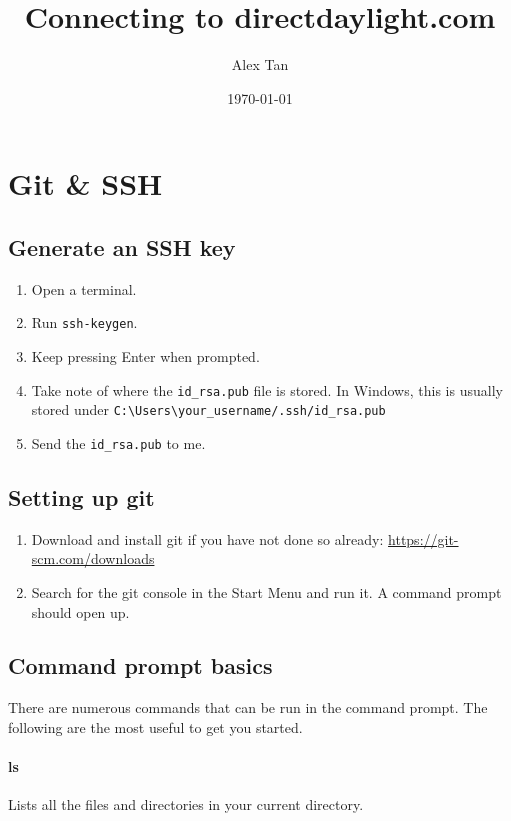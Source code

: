 \documentclass[11pt]{article}
\begin{document}
	
\begin{titlepage}
\title{Connecting to directdaylight.com}
\author{Alex Tan}
\date{\today}
\maketitle{}
\thispagestyle{empty}
\end{titlepage}

\tableofcontents
\thispagestyle{empty}
\clearpage

\setcounter{page}{1}

\section{Git \& SSH}
\subsection{Generate an SSH key}
\begin{enumerate}
\item Open a terminal.
\item Run \lstinline{ssh-keygen}.
\item Keep pressing Enter when prompted.
\item Take note of where the \lstinline{id_rsa.pub} file is stored. In Windows, this is usually stored under \lstinline{C:\Users\your_username/.ssh/id_rsa.pub}
\item Send the \lstinline{id_rsa.pub} to me.
\end{enumerate}
\subsection{Setting up git}
\begin{enumerate}
\item Download and install git if you have not done so already: \url{https://git-scm.com/downloads}
\item Search for the git console in the Start Menu and run it. A command prompt should open up.
\end{enumerate}
\subsection{Command prompt basics}
There are numerous commands that can be run in the command prompt. The following are the most useful to get you started.
\paragraph{ls}
Lists all the files and directories in your current directory.
\end{document}
